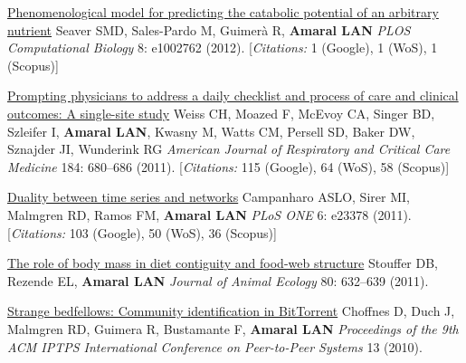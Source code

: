 \NumberedItem{\makebox[0.8cm][r]{[95]}}
\href{/people/amaral/phenomenological-model-predicting-catabolic-potential-arbitrary-nutrient}
{Phenomenological model for predicting the catabolic potential of an arbitrary nutrient}
\newline
Seaver SMD, Sales-Pardo M, Guimer\`a R, {\textbf{Amaral LAN}}
\newline
\textit{PLOS Computational Biology}
    8:
e1002762 (2012).
    [{\em{Citations:}} 1 (Google), 1 (WoS), 1 (Scopus)]
\newline
\Gap
~
\Gap

\NumberedItem{\makebox[0.8cm][r]{[94]}}
\href{/people/amaral/prompting-physicians-address-daily-checklist-and-process-care-and-clinical-outcomes-single-site-study}
{Prompting physicians to address a daily checklist and process of care and clinical outcomes: A single-site study}
\newline
Weiss CH, Moazed F, McEvoy CA, Singer BD, Szleifer I, {\textbf{Amaral LAN}}, Kwasny M, Watts CM, Persell SD, Baker DW, Sznajder JI, Wunderink RG
\newline
\textit{American Journal of Respiratory and Critical Care Medicine}
    184:
680--686 (2011).
    [{\em{Citations:}} 115 (Google), 64 (WoS), 58 (Scopus)]
\newline
\Gap
~
\Gap

\NumberedItem{\makebox[0.8cm][r]{[93]}}
\href{/people/amaral/duality-between-time-series-and-networks}
{Duality between time series and networks}
\newline
Campanharo ASLO, Sirer MI, Malmgren RD, Ramos FM, {\textbf{Amaral LAN}}
\newline
\textit{PLoS ONE}
    6:
e23378 (2011).
    [{\em{Citations:}} 103 (Google), 50 (WoS), 36 (Scopus)]
\newline
\Gap
~
\Gap

\NumberedItem{\makebox[0.8cm][r]{[92]}}
\href{/people/amaral/role-body-mass-diet-contiguity-and-food-web-structure}
{The role of body mass in diet contiguity and food-web structure}
\newline
Stouffer DB, Rezende EL, {\textbf{Amaral LAN}}
\newline
\textit{Journal of  Animal Ecology}
    80:
632--639 (2011).
\newline
\Gap
~
\Gap

\NumberedItem{\makebox[0.8cm][r]{[91]}}
\href{/people/amaral/strange-bedfellows-community-identification-bittorrent}
{Strange bedfellows: Community identification in BitTorrent}
\newline
Choffnes D, Duch J, Malmgren RD, Guimera R, Bustamante F, {\textbf{Amaral LAN}}
\newline
\textit{Proceedings of the 9th ACM IPTPS International Conference on Peer-to-Peer Systems}
13 (2010).
\newline
\Gap
~
\Gap

